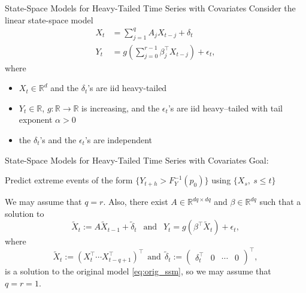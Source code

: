 \documentclass{beamer}
\newtheorem{remark}{Remark}[section]
\def\R{\mathbb R}
\begin{document}

\begin{frame}{State-Space Models for Heavy-Tailed Time Series with Covariates}
    Consider the linear state-space model
    \begin{equation}\label{eq:orig_ssm}
        \begin{split}
            X_t &= \sum_{j = 1}^q A_j X_{t - j} + \delta_t \\
            Y_t &= g \left( \sum_{j = 0}^{r - 1} \beta_j^{\top} X_{t - j} \right) + \epsilon_t,
        \end{split}
    \end{equation}
    where
    \begin{itemize}
        \item $X_t \in \R^d$ and the $\delta_t$'s are iid heavy-tailed
        \item $Y_t \in \R$, $g :\R \to \R$ is increasing, and the $\epsilon_t$'s are iid heavy--tailed with tail exponent $\alpha > 0$
        \item the $\delta_t$'s and the $\epsilon_t$'s are independent
    \end{itemize}
\end{frame}

\begin{frame}{State-Space Models for Heavy-Tailed Time Series with Covariates}
    Goal:
    \begin{center}
        Predict extreme events of the form $\{Y_{t + h} > F_Y^{-1}(p_0)\}$ using $\{X_s, \ s \le t\}$    
    \end{center}

    \medskip
    
    We may assume that $q = r$. Also, there exist $A \in \R^{dq \times dq}$ and $\beta \in \R^{dq}$ such that a solution to
    \begin{equation}\label{eq:new_ssm}
    \tilde X_t := A \tilde X_{t-1} + \tilde \delta_t\ \ \mbox{ and }\ \ Y_t = g(\beta^{\top}\tilde X_t) + \epsilon_t,
    \end{equation}
    where
    \[
    \tilde{X}_t := (X_t^{\top} \cdots X_{t - q + 1}^{\top})^{\top} \ \ \text{and} \ \
    \tilde{\delta}_t := (\begin{matrix} \delta_t^{\top} & 0 & \cdots & 0 \end{matrix})^{\top},
    \]
    is a solution to the original model \eqref{eq:orig_ssm}, so we may assume that $q = r = 1$.
\end{frame}
\end{document}
